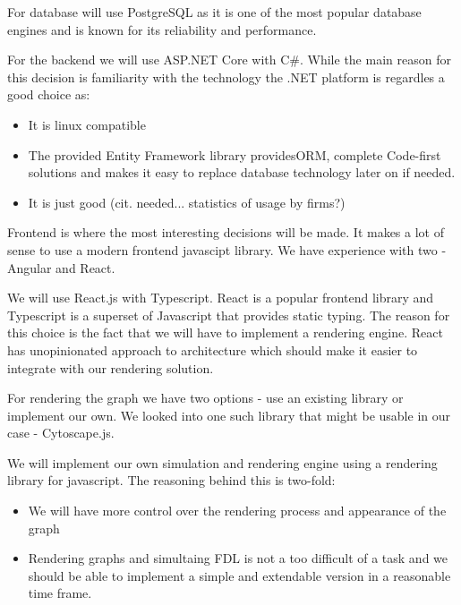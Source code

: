 For database will use PostgreSQL as it is one of the most popular database engines and is known for its reliability and performance.

For the backend we will use ASP.NET Core with C\#.
While the main reason for this decision is familiarity with the technology the .NET platform is regardles a good choice as:
\begin{itemize}
    \item It is linux compatible
    \item The provided Entity Framework library providesORM, complete Code-first solutions and makes it easy to replace database technology later on if needed.
    \item It is just good (cit. needed... statistics of usage by firms?)
\end{itemize}

Frontend is where the most interesting decisions will be made. It makes a lot of sense to use a modern frontend javascipt library.
We have experience with two - Angular and React.

We will use React.js with Typescript. React is a popular frontend library and Typescript is a superset of Javascript that provides static typing.
The reason for this choice is the fact that we will have to implement a rendering engine.
React has unopinionated approach to architecture which should make it easier to integrate with our rendering solution.


For rendering the graph we have two options - use an existing library or implement our own.
We looked into one such library that might be usable in our case - Cytoscape.js.

We will implement our own simulation and rendering engine using a rendering library for javascript. The reasoning behind this is two-fold:
\begin{itemize}
    \item We will have more control over the rendering process and appearance of the graph
    \item Rendering graphs and simultaing FDL is not a too difficult of a task and we should be able to implement a simple and extendable version in a reasonable time frame.
\end{itemize}

